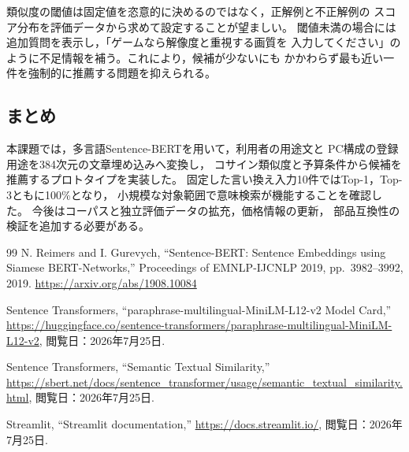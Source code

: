 \documentclass[a4paper,11pt]{article}
\begin{document}
類似度の閾値は固定値を恣意的に決めるのではなく，正解例と不正解例の
スコア分布を評価データから求めて設定することが望ましい。
閾値未満の場合には追加質問を表示し，「ゲームなら解像度と重視する画質を
入力してください」のように不足情報を補う。これにより，候補が少ないにも
かかわらず最も近い一件を強制的に推薦する問題を抑えられる。

\subsection{まとめ}
本課題では，多言語Sentence-BERTを用いて，利用者の用途文と
PC構成の登録用途を384次元の文章埋め込みへ変換し，
コサイン類似度と予算条件から候補を推薦するプロトタイプを実装した。
固定した言い換え入力10件ではTop-1，Top-3ともに100\%となり，
小規模な対象範囲で意味検索が機能することを確認した。
今後はコーパスと独立評価データの拡充，価格情報の更新，
部品互換性の検証を追加する必要がある。


\begin{thebibliography}{99}
N. Reimers and I. Gurevych,
``Sentence-BERT: Sentence Embeddings using Siamese BERT-Networks,''
Proceedings of EMNLP-IJCNLP 2019, pp.~3982--3992, 2019.
\url{https://arxiv.org/abs/1908.10084}

Sentence Transformers,
``paraphrase-multilingual-MiniLM-L12-v2 Model Card,''
\url{https://huggingface.co/sentence-transformers/paraphrase-multilingual-MiniLM-L12-v2},
閲覧日：2026年7月25日.

Sentence Transformers,
``Semantic Textual Similarity,''
\url{https://sbert.net/docs/sentence_transformer/usage/semantic_textual_similarity.html},
閲覧日：2026年7月25日.

Streamlit,
``Streamlit documentation,''
\url{https://docs.streamlit.io/},
閲覧日：2026年7月25日.
\end{thebibliography}
\end{document}
